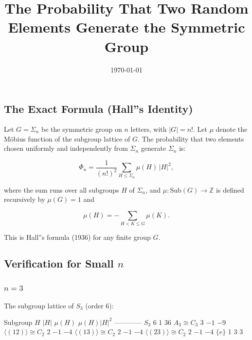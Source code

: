 \documentclass[12pt,a4paper]{article}
\begin{document}
\title{The Probability That Two Random Elements Generate the Symmetric Group}
\date{\today}

\maketitle

\subsection{The Exact Formula (Hall''s Identity)}

Let $G = Σ_n$ be the symmetric group on $n$ letters, with $|G| = n!$. Let $\mu$ denote the
Möbius function of the subgroup lattice of $G$. The probability that two elements chosen
uniformly and independently from $Σ_n$ generate $Σ_n$ is:

\[Φ_n = \frac{1}{(n!)^2}\sum_{H \leq Σ_n} \mu(H)\, |H|^2, \tag{1}\]

where the sum runs over all subgroups $H$ of $Σ_n$, and $\mu: \text{Sub}(G) \to \mathbb{Z}$
is defined recursively by $\mu(G) = 1$ and

\[\mu(H) = -\sum_{H < K \leq G} \mu(K). \tag{2}\]

This is Hall''s formula (1936) for any finite group $G$.

\subsection{Verification for Small $n$}

\subsubsection{$n = 3$}

The subgroup lattice of $S_3$ (order 6):

\textbar{} Subgroup $H$ \textbar{} $|H|$ \textbar{} $\mu(H)$ \textbar{} $\mu(H)|H|^2$ \textbar{}
\textbar{}---\textbar{}---\textbar{}---\textbar{}---\textbar{}
\textbar{} $S_3$ \textbar{} 6 \textbar{} 1 \textbar{} 36 \textbar{}
\textbar{} $A_3 \cong C_3$ \textbar{} 3 \textbar{} $-1$ \textbar{} $-9$ \textbar{}
\textbar{} $\langle(12)\rangle \cong C_2$ \textbar{} 2 \textbar{} $-1$ \textbar{} $-4$ \textbar{}
\textbar{} $\langle(13)\rangle \cong C_2$ \textbar{} 2 \textbar{} $-1$ \textbar{} $-4$ \textbar{}
\textbar{} $\langle(23)\rangle \cong C_2$ \textbar{} 2 \textbar{} $-1$ \textbar{} $-4$ \textbar{}
\textbar{} $\{e\}$ \textbar{} 1 \textbar{} 3 \textbar{} 3 \textbar{}
\end{document}
